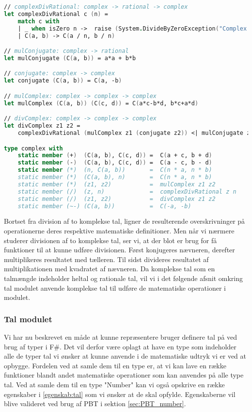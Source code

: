 \begin{lstlisting}[language={FSharp}, 
    label={complex_operations},
    caption={Overskrivning af operationer på komplekse tal}]
// complexDivRational: complex -> rational -> complex
let complexDivRational c (n) = 
    match c with
    | _ when isZero n ->  raise (System.DivideByZeroException("Complex.divRational: Cannot divide by zero!"))
    | C(a, b) -> C(a / n, b / n) 

// mulConjugate: complex -> rational
let mulConjugate (C(a, b)) = a*a + b*b

// conjugate: complex -> complex
let conjugate (C(a, b)) = C(a, -b)

// mulComplex: complex -> complex -> complex
let mulComplex (C(a, b)) (C(c, d)) = C(a*c-b*d, b*c+a*d)

// divComplex: complex -> complex -> complex
let divComplex z1 z2 =
    complexDivRational (mulComplex z1 (conjugate z2)) <| mulConjugate z2

type complex with
    static member (+)  (C(a, b), C(c, d)) =  C(a + c, b + d)
    static member (-)  (C(a, b), C(c, d)) =  C(a - c, b - d)
    static member (*)  (n, C(a, b))       =  C(n * a, n * b)
    static member (*)  (C(a, b), n)       =  C(n * a, n * b)
    static member (*)  (z1, z2)           =  mulComplex z1 z2
    static member (/)  (z, n)             =  complexDivRational z n
    static member (/)  (z1, z2)           =  divComplex z1 z2 
    static member (~-) (C(a, b))          =  C(-a, -b)
\end{lstlisting}    

Bortset fra division af to komplekse tal, ligner de resulterende overskrivninger på operationerne deres respektive matematiske definitioner. Men når vi nærmere studerer divisionen af to komplekse tal, ser vi, at der blot er brug for få funktioner til at kunne udføre divisionen. Først konjugeres nævneren, derefter multiplikeres resultatet med tælleren. Til sidst divideres resultatet af multiplikationen med kvadratet af nævneren. Da komplekse tal som en talmængde indeholder heltal og rationale tal, vil vi i det følgende afsnit omkring tal modulet anvende komplekse tal til udføre de matematiske operationer i modulet.


\subsubsection{Tal modulet}
Vi har nu beskrevet en måde at kunne repræsentere bruger definere tal på ved brug af typer i F\#. Det vil derfor være oplagt at have en type som indeholder alle de typer tal vi ønsker at kunne anvende i de matematiske udtryk vi er ved at opbygge. Fordelen ved at samle dem til en type er, at vi kan lave en række funktioner blandt andet matematiske operationer som kan anvendes på alle type tal. Ved at samle dem til en type "Number" kan vi også opskrive en række egenskaber i \ref{egenskab:tal} som vi ønsker at de skal opfylde. Egenskaberne vil blive valideret ved brug af PBT i sektion \ref{sec:PBT_number}.

